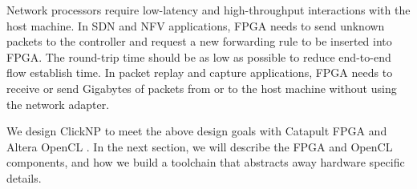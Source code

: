 { Network processors require low-latency and high-throughput interactions with the host machine. In SDN and NFV applications, FPGA needs to send unknown packets to the controller and request a new forwarding rule to be inserted into FPGA. The round-trip time should be as low as possible to reduce end-to-end flow establish time. In packet replay and capture applications, FPGA needs to receive or send Gigabytes of packets from or to the host machine without using the network adapter.

We design ClickNP to meet the above design goals with Catapult FPGA \cite{putnam2014reconfigurable} and Altera OpenCL \cite{singh2011implementing}. In the next section, we will describe the FPGA and OpenCL components, and how we build a toolchain that abstracts away hardware specific details.
}


